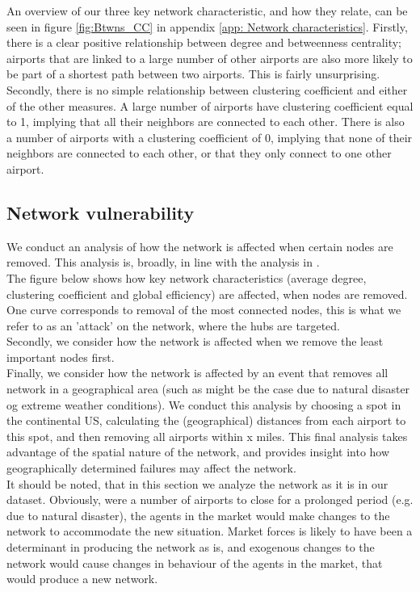 An overview of our three key network characteristic, and how they relate, can be seen in figure \ref{fig:Btwns_CC} in appendix \ref{app: Network characteristics}. Firstly, there is a clear positive relationship between degree and betweenness centrality; airports that are linked to a large number of other airports are also more likely to be part of a shortest path between two airports. This is fairly unsurprising. Secondly, there is no simple relationship between clustering coefficient and either of the other measures. A large number of airports have clustering coefficient equal to 1, implying that all their neighbors are connected to each other. There is also a number of airports with a clustering coefficient of 0, implying that none of their neighbors are connected to each other, or that they only connect to one other airport. 

\subsection{Network vulnerability}
We conduct an analysis of how the network is affected when certain nodes are removed. This analysis is, broadly, in line with the analysis in \cite{chi2004structural}. \\
The figure below shows how key network characteristics (average degree, clustering coefficient and global efficiency) are affected, when nodes are removed. One curve corresponds to removal of the most connected nodes, this is what we refer to as an 'attack' on the network, where the hubs are targeted. \\
Secondly, we consider how the network is affected when we remove the least important nodes first. \\
Finally, we consider how the network is affected by an event that removes all network in a geographical area (such as might be the case due to natural disaster og extreme weather conditions). We conduct this analysis by choosing a spot in the continental US, calculating the (geographical) distances from each airport to this spot, and then removing all airports within x miles. This final analysis takes advantage of the spatial nature of the network, and provides insight into how geographically determined failures may affect the network. \\
It should be noted, that in this section we analyze the network as it is in our dataset. Obviously, were a number of airports to close for a prolonged period (e.g. due to natural disaster), the agents in the market would make changes to the network to accommodate the new situation. Market forces is likely to have been a determinant in producing the network as is, and exogenous changes to the network would cause changes in behaviour of the agents in the market, that would produce a new network. \\ 

